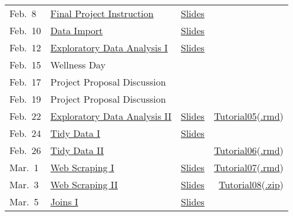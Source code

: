 \documentclass[
]{article}
\begin{document}
\begin{longtable}[]{@{}llrr@{}}
Feb.~8 &
\href{https://uncch.hosted.panopto.com/Panopto/Pages/Viewer.aspx?id=19e851c3-2fd6-451f-86af-acc900e8b49d}{Final
Project Instruction} &
\href{Lecture/Lecture09/Lecture\%2009\%20Final_Project.pdf}{Slides}
&\tabularnewline
Feb.~10 &
\href{https://uncch.hosted.panopto.com/Panopto/Pages/Viewer.aspx?id=35a9948d-9b68-4e56-82d9-accb00e8283d}{Data
Import} &
\href{Lecture/Lecture10/Lecture\%2010\%20Data_Import.pdf}{Slides}
&\tabularnewline
Feb.~12 &
\href{https://uncch.hosted.panopto.com/Panopto/Pages/Viewer.aspx?id=6529623f-d95c-4142-bab3-accd00e90377}{Exploratory
Data Analysis I} &
\href{Lecture/Lecture11/Lecture\%2011\%20Exploratory_Data_Analysis.pdf}{Slides}
&\tabularnewline
Feb.~15 & Wellness Day & &\tabularnewline
Feb.~17 & Project Proposal Discussion & &\tabularnewline
Feb.~19 & Project Proposal Discussion & &\tabularnewline
Feb.~22 &
\href{https://uncch.hosted.panopto.com/Panopto/Pages/Viewer.aspx?id=1a482bc2-7636-4e9d-81aa-acd700e90539}{Exploratory
Data Analysis II} &
\href{Lecture/Lecture12/Lecture\%2012\%20Exploratory_Data_Analysis.pdf}{Slides}
&
\href{Tutorial/Tutorial-05_sol.html}{Tutorial05}(\href{https://drive.google.com/file/d/11MStXK9znEnu-MMmj1ZPMqSMIyciytNN/view?usp=sharing}{.rmd})\tabularnewline
Feb.~24 &
\href{https://uncch.hosted.panopto.com/Panopto/Pages/Viewer.aspx?id=0d214076-b2ec-4da1-9d10-acd900e40078}{Tidy
Data I} & \href{Lecture/Lecture13/Lecture13\%20Tidy\%20Data.pdf}{Slides}
&\tabularnewline
Feb.~26 &
\href{https://uncch.hosted.panopto.com/Panopto/Pages/Viewer.aspx?id=3a4d613e-8688-4e04-8991-acdb00e8e99d}{Tidy
Data II} & &
\href{Tutorial/Tutorial06_sol.html}{Tutorial06}(\href{https://drive.google.com/file/d/1ONpR1uWseqxfUJR4UgkqHMlMvV8u5Gdb/view?usp=sharing}{.rmd})\tabularnewline
Mar.~1 &
\href{https://uncch.hosted.panopto.com/Panopto/Pages/Viewer.aspx?id=82b7e0c7-ffe3-4227-951d-acde00ef2238}{Web
Scraping I} &
\href{Lecture/Lecture15/Lecture\%2015\%20Web\%20Scraping.pdf}{Slides} &
\href{Tutorial/Tutorial07.html}{Tutorial07}(\href{https://drive.google.com/file/d/1GaRdMRkDsI3rnY4tWh5RR4wdo423FRhd/view?usp=sharing}{.rmd})\tabularnewline
Mar.~3 &
\href{https://uncch.hosted.panopto.com/Panopto/Pages/Viewer.aspx?id=b3a73808-0226-4ec0-b49b-ace000e95880}{Web
Scraping II} &
\href{Lecture/Lecture16/Lecture\%2016\%20Web\%20Scraping\%20II.pdf}{Slides}
&
\href{Tutorial/Tutorial08_sol.html}{Tutorial08}(\href{https://drive.google.com/file/d/1Hnj10zSpNxLnH_3B2hpNVSG0znimHY4R/view?usp=sharing}{.zip})\tabularnewline
Mar.~5 &
\href{https://uncch.hosted.panopto.com/Panopto/Pages/Viewer.aspx?id=809f5b59-f1fd-4ad0-a2c8-ace200e5e9bf}{Joins
I} & \href{Lecture/Lecture17/Lecture\%2017\%20Joins.pdf}{Slides} &

\end{longtable}
\end{document}
